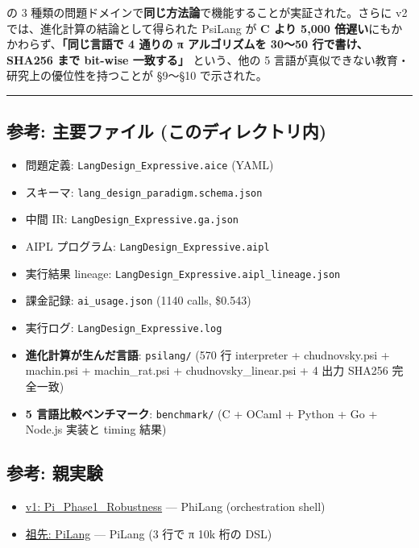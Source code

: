 \documentclass[
]{ltjsarticle}
\providecommand{\tightlist}{%
  \setlength{\itemsep}{0pt}\setlength{\parskip}{0pt}}
\begin{document}
の 3
種類の問題ドメインで\textbf{同じ方法論}で機能することが実証された。さらに
v2 では、進化計算の結論として得られた PsiLang が \textbf{C より 5,000
倍遅い}にもかかわらず、\textbf{「同じ言語で 4 通りの π アルゴリズムを
30〜50 行で書け、SHA256 まで bit-wise 一致する」} という、他の 5
言語が真似できない教育・研究上の優位性を持つことが §9〜§10 で示された。

\begin{center}\rule{0.5\linewidth}{0.5pt}\end{center}

\subsection{参考: 主要ファイル
(このディレクトリ内)}\label{ux53c2ux8003-ux4e3bux8981ux30d5ux30a1ux30a4ux30eb-ux3053ux306eux30c7ux30a3ux30ecux30afux30c8ux30eaux5185}

\begin{itemize}
\tightlist
\item
  問題定義: \texttt{LangDesign\_Expressive.aice} (YAML)
\item
  スキーマ: \texttt{lang\_design\_paradigm.schema.json}
\item
  中間 IR: \texttt{LangDesign\_Expressive.ga.json}
\item
  AIPL プログラム: \texttt{LangDesign\_Expressive.aipl}
\item
  実行結果 lineage: \texttt{LangDesign\_Expressive.aipl\_lineage.json}
\item
  課金記録: \texttt{ai\_usage.json} (1140 calls, \$0.543)
\item
  実行ログ: \texttt{LangDesign\_Expressive.log}
\item
  \textbf{進化計算が生んだ言語}: \texttt{psilang/} (570 行 interpreter +
  chudnovsky.psi + machin.psi + machin\_rat.psi + chudnovsky\_linear.psi
  + 4 出力 SHA256 完全一致)
\item
  \textbf{5 言語比較ベンチマーク}: \texttt{benchmark/} (C + OCaml +
  Python + Go + Node.js 実装と timing 結果)
\end{itemize}

\subsection{参考: 親実験}\label{ux53c2ux8003-ux89aaux5b9fux9a13}

\begin{itemize}
\tightlist
\item
  \href{../2026-05-16_robustness_v1/REPORT.md}{v1:
  Pi\_Phase1\_Robustness} --- PhiLang (orchestration shell)
\item
  \href{../../REPORT_JA.md}{祖先: PiLang} --- PiLang (3 行で π 10k 桁の
  DSL)
\end{itemize}
\end{document}
